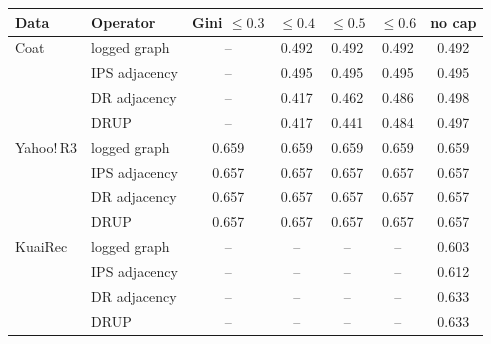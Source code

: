 \begin{tabular}{llccccc}
\toprule
Data & Operator & Gini $\le0.3$ & $\le0.4$ & $\le0.5$ & $\le0.6$ & no cap\\
\midrule
Coat & logged graph & -- & 0.492 & 0.492 & 0.492 & 0.492\\
 & IPS adjacency & -- & 0.495 & 0.495 & 0.495 & 0.495\\
 & DR adjacency & -- & 0.417 & 0.462 & 0.486 & 0.498\\
 & DRUP & -- & 0.417 & 0.441 & 0.484 & 0.497\\
\midrule
Yahoo!\,R3 & logged graph & 0.659 & 0.659 & 0.659 & 0.659 & 0.659\\
 & IPS adjacency & 0.657 & 0.657 & 0.657 & 0.657 & 0.657\\
 & DR adjacency & 0.657 & 0.657 & 0.657 & 0.657 & 0.657\\
 & DRUP & 0.657 & 0.657 & 0.657 & 0.657 & 0.657\\
\midrule
KuaiRec & logged graph & -- & -- & -- & -- & 0.603\\
 & IPS adjacency & -- & -- & -- & -- & 0.612\\
 & DR adjacency & -- & -- & -- & -- & 0.633\\
 & DRUP & -- & -- & -- & -- & 0.633\\
\bottomrule
\end{tabular}
